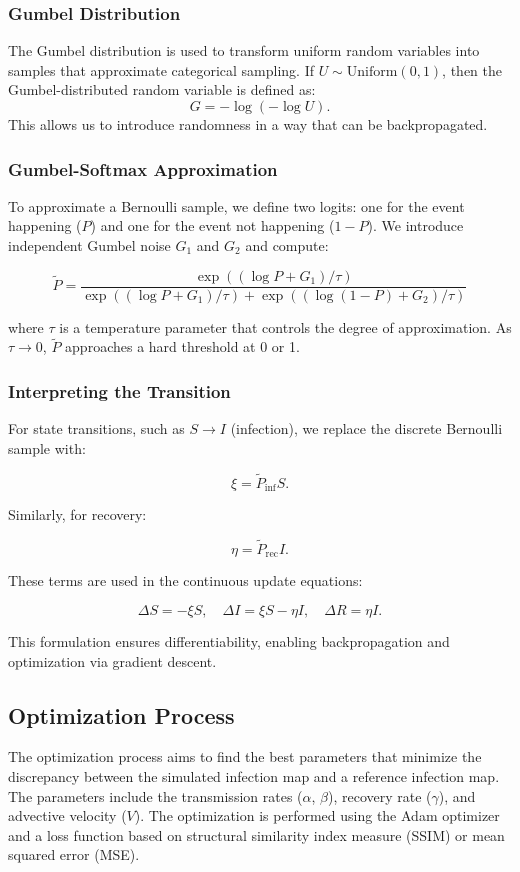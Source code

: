 \documentclass[12pt]{article}
\begin{document}
\subsubsection{Gumbel Distribution}
The Gumbel distribution is used to transform uniform random variables into samples that approximate categorical sampling. If \( U \sim \text{Uniform}(0,1) \), then the Gumbel-distributed random variable is defined as:
\[
G = -\log(-\log U).
\]
This allows us to introduce randomness in a way that can be backpropagated.

\subsubsection{Gumbel-Softmax Approximation}
To approximate a Bernoulli sample, we define two logits: one for the event happening (\( P \)) and one for the event not happening (\( 1 - P \)). We introduce independent Gumbel noise \( G_1 \) and \( G_2 \) and compute:

\[
\tilde{P} = \frac{\exp\left((\log P + G_1)/\tau\right)}{\exp\left((\log P + G_1)/\tau\right) + \exp\left((\log (1-P) + G_2)/\tau\right)}
\]

where \( \tau \) is a temperature parameter that controls the degree of approximation. As \( \tau \to 0 \), \( \tilde{P} \) approaches a hard threshold at 0 or 1.

\subsubsection{Interpreting the Transition}
For state transitions, such as \( S \to I \) (infection), we replace the discrete Bernoulli sample with:

\[
\xi = \tilde{P}_{\text{inf}} S.
\]

Similarly, for recovery:

\[
\eta = \tilde{P}_{\text{rec}} I.
\]

These terms are used in the continuous update equations:

\[
\Delta S = -\xi S, \quad \Delta I = \xi S - \eta I, \quad \Delta R = \eta I.
\]

This formulation ensures differentiability, enabling backpropagation and optimization via gradient descent.

\subsection{Optimization Process}
The optimization process aims to find the best parameters that minimize the discrepancy between the simulated infection map and a reference infection map. The parameters include the transmission rates ($\alpha$, $\beta$), recovery rate ($\gamma$), and advective velocity ($V$). The optimization is performed using the Adam optimizer and a loss function based on structural similarity index measure (SSIM) or mean squared error (MSE).
\end{document}
